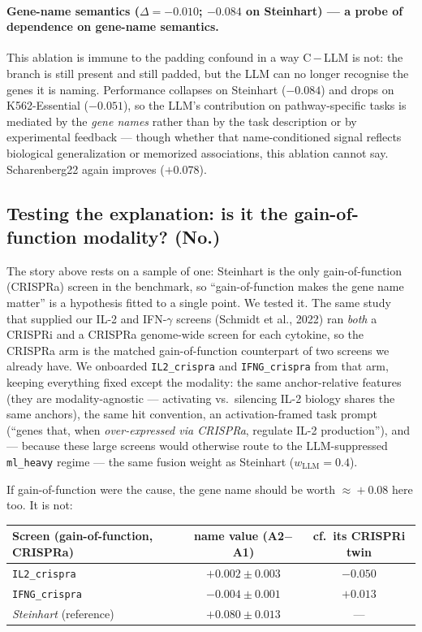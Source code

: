 \documentclass[11pt]{article}
\begin{document}
\paragraph{Gene-name semantics ($\Delta = -0.010$; $-0.084$ on Steinhart) --- a probe of dependence on gene-name semantics.}
This ablation is immune to the padding confound in a way C\,$-$\,LLM is not: the branch is still
present and still padded, but the LLM can no longer recognise the genes it is naming. Performance
collapses on Steinhart ($-0.084$) and drops on K562-Essential ($-0.051$), so the LLM's contribution
on pathway-specific tasks is mediated by the \emph{gene names} rather than by the task description or by
experimental feedback --- though whether that name-conditioned signal reflects biological generalization
or memorized associations, this ablation cannot say. Scharenberg22 again improves ($+0.078$).

\subsection*{Testing the explanation: is it the gain-of-function modality? (No.)}

The story above rests on a sample of one: Steinhart is the only gain-of-function (CRISPRa) screen in
the benchmark, so ``gain-of-function makes the gene name matter'' is a hypothesis fitted to a single
point. We tested it. The same study that supplied our IL-2 and IFN-$\gamma$ screens (Schmidt et al.,
2022) ran \emph{both} a CRISPRi and a CRISPRa genome-wide screen for each cytokine, so the CRISPRa arm
is the matched gain-of-function counterpart of two screens we already have. We onboarded
\texttt{IL2\_crispra} and \texttt{IFNG\_crispra} from that arm, keeping everything fixed except the
modality: the same anchor-relative features (they are modality-agnostic --- activating vs.\ silencing
IL-2 biology shares the same anchors), the same hit convention, an activation-framed task prompt
(``genes that, when \emph{over-expressed via CRISPRa}, regulate IL-2 production''), and --- because
these large screens would otherwise route to the LLM-suppressed \texttt{ml\_heavy} regime --- the same
fusion weight as Steinhart ($w_{\mathrm{LLM}}=0.4$).

If gain-of-function were the cause, the gene name should be worth $\approx\!+0.08$ here too. It is not:

\begin{center}\small
\begin{tabular}{lcc}
\toprule
Screen (gain-of-function, CRISPRa) & name value (A2$-$A1) & cf.\ its CRISPRi twin \\
\midrule
\texttt{IL2\_crispra}  & $+0.002 \pm 0.003$ & $-0.050$ \\
\texttt{IFNG\_crispra} & $-0.004 \pm 0.001$ & $+0.013$ \\
\midrule
\emph{Steinhart} (reference) & \emph{$+0.080 \pm 0.013$} & --- \\
\bottomrule
\end{tabular}
\end{center}
\end{document}

